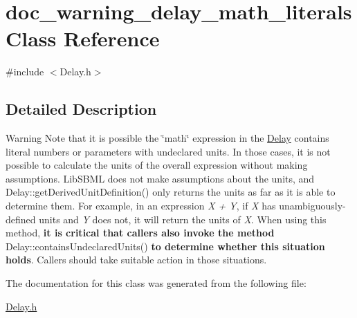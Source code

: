 \hypertarget{classdoc__warning__delay__math__literals}{}\section{doc\+\_\+warning\+\_\+delay\+\_\+math\+\_\+literals Class Reference}
\label{classdoc__warning__delay__math__literals}


{\ttfamily \#include $<$Delay.\+h$>$}



\subsection{Detailed Description}
\begin{DoxyWarning}{Warning}
Note that it is possible the \char`\"{}math\char`\"{} expression in the \hyperlink{class_delay}{Delay} contains literal numbers or parameters with undeclared units. In those cases, it is not possible to calculate the units of the overall expression without making assumptions. Lib\+S\+B\+ML does not make assumptions about the units, and Delay\+::get\+Derived\+Unit\+Definition() only returns the units as far as it is able to determine them. For example, in an expression {\itshape X + Y}, if {\itshape X} has unambiguously-\/defined units and {\itshape Y} does not, it will return the units of {\itshape X}. When using this method, {\bfseries it is critical that callers also invoke the method} Delay\+::contains\+Undeclared\+Units() {\bfseries to determine whether this situation holds}. Callers should take suitable action in those situations. 
\end{DoxyWarning}


The documentation for this class was generated from the following file\+:\begin{DoxyCompactItemize}
\item 
\hyperlink{_delay_8h}{Delay.\+h}\end{DoxyCompactItemize}

